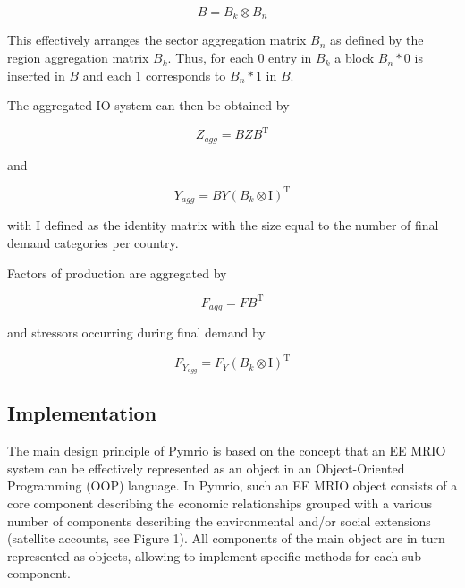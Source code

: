 \documentclass{jors}
\begin{document}
{\begin{equation}
    B = B_k \otimes B_n
\end{equation}

This effectively arranges the sector aggregation matrix $B_n$ as defined by
the region aggregation matrix $B_k$. Thus, for each 0 entry in $B_k$ a block
$B_n * 0$ is inserted in $B$ and each 1 corresponds to $B_n * 1$ in $B$.

The aggregated IO system can then be obtained by

\begin{equation}
    Z_{agg} = BZB^\mathrm{T} 
\end{equation}

and

\begin{equation}
    Y_{agg} = BY(B_k \otimes \mathrm{I})^\mathrm{T}
\end{equation}

with $\mathrm{I}$ defined as the identity matrix with the size equal to the number of final demand
categories per country.

Factors of production are aggregated by

\begin{equation}
    F_{agg} = FB^\mathrm{T} 
\end{equation}

and stressors occurring during final demand by

\begin{equation}
    F_{Y_{agg}} = F_Y(B_k \otimes \mathrm{I})^\mathrm{T}
\end{equation}

}

\subsection*{Implementation}


The main design principle of Pymrio is based on the concept that an EE MRIO system can be effectively represented as an object in an Object-Oriented Programming (OOP) language.
In Pymrio, such an EE MRIO object consists of a core component describing the economic relationships grouped with a various number of components describing the environmental and/or social extensions (satellite accounts, see Figure 1). 
All components of the main object are in turn represented as objects, allowing to implement specific methods for each sub-component.
\end{document}

